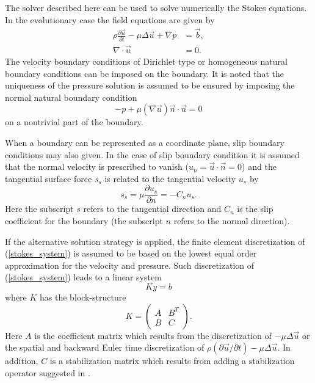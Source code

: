 \begin{versiona}
The solver described here can be used to solve numerically the  
Stokes equations.
In the evolutionary case the field equations are given by
\begin{equation}\label{stokes_system}
\begin{split}
\rho\frac{\partial\vec u}{\partial t} - \mu \Delta\vec u +\nabla p &= \vec b, \\
\nabla \cdot \vec u &= 0.
\end{split}
\end{equation}
The velocity boundary conditions of Dirichlet type or
homogeneous natural boundary conditions can be imposed on the boundary.
It is noted that
the uniqueness of the pressure solution is assumed to be 
ensured by imposing the normal natural boundary condition        
\begin{equation}\label{Neumann-outflow}
-p + \mu (\nabla\vec u)\vec n\cdot\vec n = 0
\end{equation}
on a nontrivial part of the boundary. 

When a boundary can be represented as a coordinate plane,
slip boundary conditions may also given. In the case of slip
boundary condition it is assumed that the normal velocity is prescribed
to vanish ($u_n = \vec u \cdot \vec n = 0$) and the tangential
surface force $s_s$ is related to the tangential velocity $u_s$ by
\begin{equation}\label{slipbc}
s_s = \mu \frac{\partial u_s}{\partial n} = -C_n u_s.
\end{equation}
Here the subscript $s$ refers to the tangential direction and 
$C_n$ is the slip coefficient for the boundary (the subscript $n$ refers to
the normal direction).

If the alternative solution strategy is applied,  
the finite element discretization of (\ref{stokes_system}) is assumed to be 
based on the lowest equal order approximation for the velocity and pressure. 
Such discretization of (\ref{stokes_system}) leads to a linear system 
\begin{equation}\label{discrete-stokes-system}
Ky=b
\end{equation}
where $K$ has the block-structure
\begin{equation}\label{block-structure}
K=\left( \begin{array}{cc} A    & B^T \\
                         B    & C   \end{array}\right). 
\end{equation}
Here $A$ is the coefficient matrix which results from the discretization 
of $-\mu\Delta \vec u$ or the spatial and backward Euler time discretization of
$\rho(\partial\vec u /\partial t) -\mu\Delta \vec u$.
In addition, $C$ is a stabilization matrix
which results from adding a stabilization operator suggested in \cite{Do04}.


\end{versiona}
